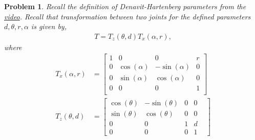 \documentclass{article}
\newtheorem{prob}{Problem}
\begin{document}
\begin{prob}
  Recall the definition of Denavit-Hartenberg parameters from the
  \href{https://www.youtube.com/watch?v=rA9tm0gTln8}{video}. Recall that
  transformation between two joints for the defined parameters $d, \theta, r,
  \alpha$ is given by,
  \begin{align}
    T = T_z(\theta, d) T_x(\alpha, r),
  \end{align}
  where
  \begin{align}
    T_x(\alpha, r) &= \begin{bmatrix}
      1 & 0 & 0 & r \\
      0 & \cos(\alpha) & -\sin(\alpha) & 0 \\
      0 & \sin(\alpha) & \cos(\alpha) & 0 \\
      0 & 0 & 0 & 1 \\
      \end{bmatrix}
    \\
    T_z(\theta, d) &= \begin{bmatrix}
      \cos(\theta) & -\sin(\theta) & 0 &  0 \\
      \sin(\theta) & \cos(\theta) & 0  & 0 \\
      0 & 0 & 1 & d & \\
      0 & 0 & 0 & 1 &
    \end{bmatrix}
  \end{align}


\end{prob}
\end{document}
